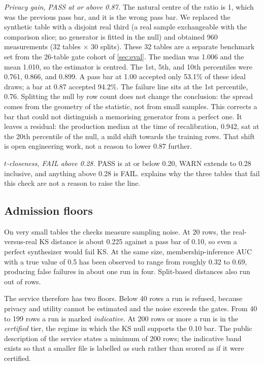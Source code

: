 \documentclass[11pt,a4paper]{article}
\begin{document}
\emph{Privacy gain, PASS at or above 0.87.} The natural centre of the ratio is 1, which was the previous pass bar, and it is the wrong pass bar. We replaced the synthetic table with a disjoint real third (a real sample exchangeable with the comparison slice; no generator is fitted in the null) and obtained 960 measurements (32 tables $\times$ 30 splits). These 32 tables are a separate benchmark set from the 26-table gate cohort of \cref{sec:eval}. The median was 1.006 and the mean 1.010, so the estimator is centred. The 1st, 5th, and 10th percentiles were 0.761, 0.866, and 0.899. A pass bar at 1.00 accepted only 53.1\% of these ideal draws; a bar at 0.87 accepted 94.2\%. The failure line sits at the 1st percentile, 0.76. Splitting the null by row count does not change the conclusion: the spread comes from the geometry of the statistic, not from small samples. This corrects a bar that could not distinguish a memorising generator from a perfect one. It leaves a residual: the production median at the time of recalibration, 0.942, sat at the 20th percentile of the null, a mild shift towards the training rows. That shift is open engineering work, not a reason to lower 0.87 further.

\emph{$t$-closeness, FAIL above 0.28.} PASS is at or below 0.20, WARN extends to 0.28 inclusive, and anything above 0.28 is FAIL.  explains why the three tables that fail this check are not a reason to raise the line.

\subsection{Admission floors}\label{sec:admission}

On very small tables the checks measure sampling noise. At 20 rows, the real-versus-real KS distance is about 0.225 against a pass bar of 0.10, so even a perfect synthesizer would fail KS. At the same size, membership-inference AUC with a true value of 0.5 has been observed to range from roughly 0.32 to 0.69, producing false failures in about one run in four. Split-based distances also run out of rows.

The service therefore has two floors. Below 40 rows a run is refused, because privacy and utility cannot be estimated and the noise exceeds the gates. From 40 to 199 rows a run is marked \emph{indicative}. At 200 rows or more a run is in the \emph{certified} tier, the regime in which the KS null supports the 0.10 bar. The public description of the service states a minimum of 200 rows; the indicative band exists so that a smaller file is labelled as such rather than scored as if it were certified.
\end{document}
